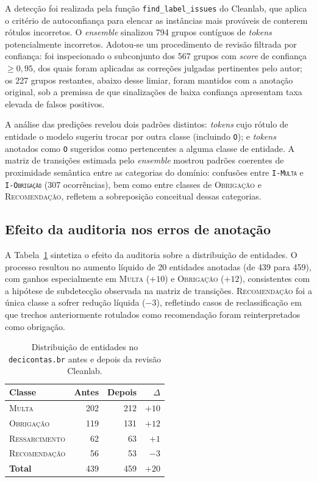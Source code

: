 A detecção foi realizada pela função \texttt{find\_label\_issues} do Cleanlab, que aplica o critério de autoconfiança para elencar as instâncias mais prováveis de conterem rótulos incorretos. O \textit{ensemble} sinalizou 794 grupos contíguos de \textit{tokens} potencialmente incorretos. Adotou-se um procedimento de revisão filtrada por confiança: foi inspecionado o subconjunto dos 567 grupos com \textit{score} de confiança $\geq 0{,}95$, dos quais foram aplicadas as correções julgadas pertinentes pelo autor; os 227 grupos restantes, abaixo desse limiar, foram mantidos com a anotação original, sob a premissa de que sinalizações de baixa confiança apresentam taxa elevada de falsos positivos.

A análise das predições revelou dois padrões distintos: \textit{tokens} cujo rótulo de entidade o modelo sugeriu trocar por outra classe (incluindo \texttt{O}); e \textit{tokens} anotados como \texttt{O} sugeridos como pertencentes a alguma classe de entidade. A matriz de transições estimada pelo \textit{ensemble} mostrou padrões coerentes de proximidade semântica entre as categorias do domínio: confusões entre \texttt{I-\textsc{Multa}} e \texttt{I-\textsc{Obrigação}} (307 ocorrências), bem como entre classes de \textsc{Obrigação} e \textsc{Recomendação}, refletem a sobreposição conceitual dessas categorias.

\subsection{Efeito da auditoria nos erros de anotação}

A Tabela~\ref{tab:dataset-corrections} sintetiza o efeito da auditoria sobre a distribuição de entidades. O processo resultou no aumento líquido de 20 entidades anotadas (de 439 para 459), com ganhos especialmente em \textsc{Multa} ($+10$) e \textsc{Obrigação} ($+12$), consistentes com a hipótese de subdetecção observada na matriz de transições. \textsc{Recomendação} foi a única classe a sofrer redução líquida ($-3$), refletindo casos de reclassificação em que trechos anteriormente rotulados como recomendação foram reinterpretados como obrigação.

\begin{table}[ht]
  \centering\small
  \caption{Distribuição de entidades no \texttt{decicontas.br} antes e depois da revisão Cleanlab.}
  \label{tab:dataset-corrections}
  \begin{tabular}{lrrr}
    \toprule
    \textbf{Classe} & \textbf{Antes} & \textbf{Depois} & \textbf{$\Delta$} \\
    \midrule
    \textsc{Multa}          &  202 &  212 &   $+10$ \\
    \textsc{Obrigação}      &  119 &  131 &   $+12$ \\
    \textsc{Ressarcimento}  &   62 &   63 &    $+1$ \\
    \textsc{Recomendação}   &   56 &   53 &    $-3$ \\
    \midrule
    \textbf{Total}          &  439 &  459 &   $+20$ \\
    \bottomrule
  \end{tabular}
\end{table}

